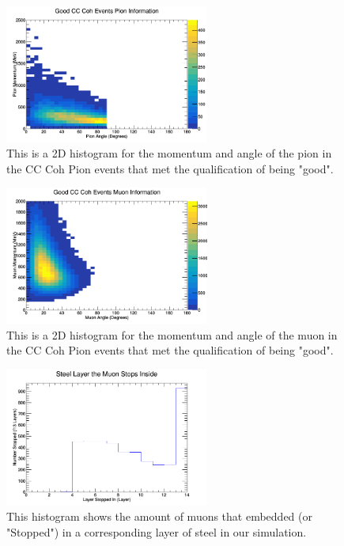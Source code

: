 \documentclass[11pt]{article}
\begin{document}
\begin{figure}[H]
\centering
\includegraphics[width=0.6\textwidth]{NewANMBergerSehgalImages/5-GoodCCCohPionInfoANMBS.png}
\caption{This is a 2D histogram for the momentum and angle of the pion in the CC Coh Pion events that met the qualification of being "good".}
\end{figure}

\begin{figure}[H]
\centering
\includegraphics[width=0.6\textwidth]{NewANMBergerSehgalImages/6-GoodCCCohMuonInfoANMBS.png}
\caption{This is a 2D histogram for the momentum and angle of the muon in the CC Coh Pion events that met the qualification of being "good".}
\end{figure}

\begin{figure}[H]
\centering
\includegraphics[width=0.6\textwidth]{NewANMBergerSehgalImages/7-LayerPenetrationANMBS.png}
\caption{This histogram shows the amount of muons that embedded (or "Stopped") in a corresponding layer of steel in our simulation.}
\end{figure}
\end{document}
